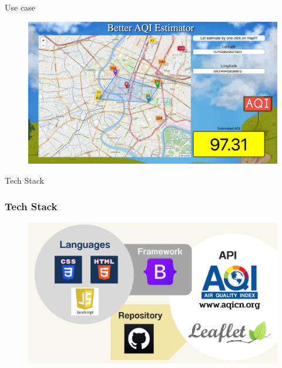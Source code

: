 \documentclass[12pt,aspectratio=169]{beamer}
\begin{document}
    \begin{frame}{Use case}
            \begin{center}
                \begin{figure}
                    \centering
                    \includegraphics[width=\textwidth]{img/web-app-click.jpeg}
                \end{figure}
            \end{center}
        \end{frame}    

\begin{frame}{Tech Stack}
\frametitle{Tech Stack}
    \begin{center}
        \begin{figure}
            \centering
            \includegraphics[width=\textwidth]{img/tech-stack.pdf}
        \end{figure}
    \end{center}
\end{frame}
\end{document}
